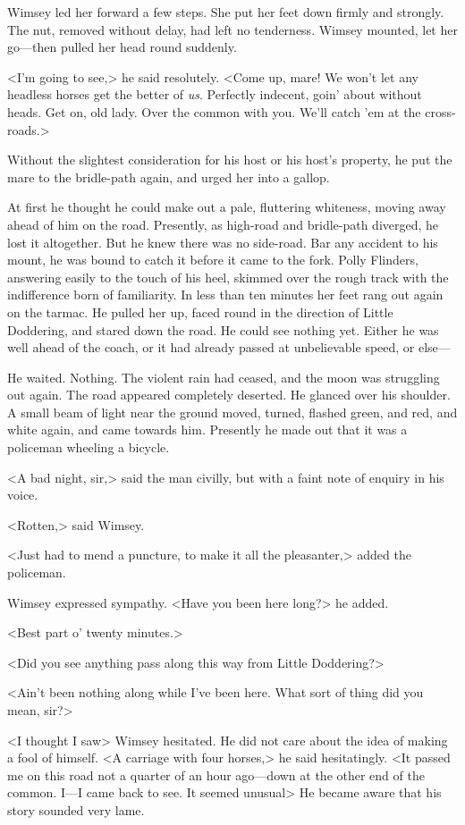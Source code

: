 Wimsey led her forward a few steps. She put her feet down firmly and strongly. The nut, removed without delay, had left no tenderness. Wimsey mounted, let her go—then pulled her head round suddenly.

<I'm going to see,> he said resolutely. <Come up, mare! We won't let any headless horses get the better of \emph{us}. Perfectly indecent, goin' about without heads. Get on, old lady. Over the common with you. We'll catch 'em at the cross-roads.>

Without the slightest consideration for his host or his host's property, he put the mare to the bridle-path again, and urged her into a gallop.

At first he thought he could make out a pale, fluttering whiteness, moving away ahead of him on the road. Presently, as high-road and bridle-path diverged, he lost it altogether. But he knew there was no side-road. Bar any accident to his mount, he was bound to catch it before it came to the fork. Polly Flinders, answering easily to the touch of his heel, skimmed over the rough track with the indifference born of familiarity. In less than ten minutes her feet rang out again on the tarmac. He pulled her up, faced round in the direction of Little Doddering, and stared down the road. He could see nothing yet. Either he was well ahead of the coach, or it had already passed at unbelievable speed, or else—

He waited. Nothing. The violent rain had ceased, and the moon was struggling out again. The road appeared completely deserted. He glanced over his shoulder. A small beam of light near the ground moved, turned, flashed green, and red, and white again, and came towards him. Presently he made out that it was a policeman wheeling a bicycle.

<A bad night, sir,> said the man civilly, but with a faint note of enquiry in his voice.

<Rotten,> said Wimsey.

<Just had to mend a puncture, to make it all the pleasanter,> added the policeman.

Wimsey expressed sympathy. <Have you been here long?> he added.

<Best part o' twenty minutes.>

<Did you see anything pass along this way from Little Doddering?>

<Ain't been nothing along while I've been here. What sort of thing did you mean, sir?>

<I thought I saw\longdash> Wimsey hesitated. He did not care about the idea of making a fool of himself. <A carriage with four horses,> he said hesitatingly. <It passed me on this road not a quarter of an hour ago—down at the other end of the common. I—I came back to see. It seemed unusual\longdash> He became aware that his story sounded very lame.


